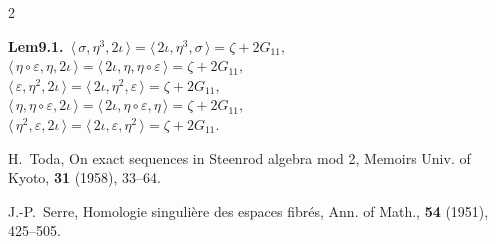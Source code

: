 \documentclass[10pt, leqno]{ltjsarticle}
\newcommand{\todas}[1]{\langle\,#1\,\rangle}
\numberwithin{equation}{section}
\theoremstyle{plain}
\theoremstyle{definition}
\theoremstyle{remark}
\begin{document}
\begin{paracol}{2}
\switchcolumn

\noindent
\textbf{Lem9.1.}\
\(\todas{\sigma,\eta^{3},2\iota}=\todas{2\iota,\eta^{3},\sigma}=\zeta+2G_{11},\)\\
\(\todas{\eta\circ\varepsilon,\eta,2\iota}=\todas{2\iota,\eta,\eta\circ\varepsilon}=\zeta+2G_{11},\)\\
\(\todas{\varepsilon,\eta^{2},2\iota}=\todas{2\iota,\eta^{2},\varepsilon}=\zeta+2G_{11},\)\\
\(\todas{\eta,\eta\circ\varepsilon,2\iota}=\todas{2\iota,\eta\circ\varepsilon,\eta}=\zeta+2G_{11},\)\\
\(\todas{\eta^{2},\varepsilon,2\iota}=\todas{2\iota,\varepsilon,\eta^{2}}=\zeta+2G_{11}.\)

\noindent
\cite{Toda1958a}
H.~Toda,
\newblock On exact sequences in Steenrod algebra mod 2,
\newblock Memoirs Univ. of Kyoto, {\bf 31} (1958), 33--64.

\noindent
\cite{Serre1951}
J.-P.~Serre,
\newblock Homologie singulière des espaces fibrés,
\newblock Ann. of Math., {\bf 54} (1951), 425--505.



\end{paracol}
\end{document}
